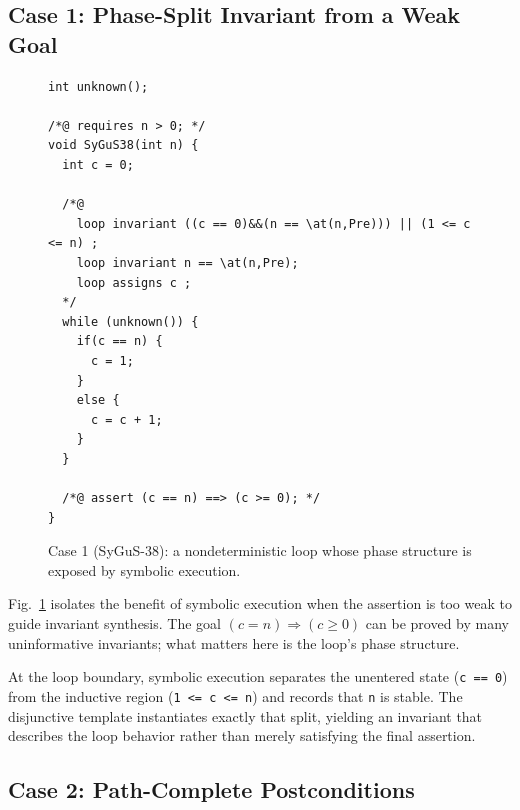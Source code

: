\subsection{Case 1: Phase-Split Invariant from a Weak Goal}

\begin{figure}[!t]
    \centering
    \begin{tcolorbox}[casebox, title={Case 1: symbolic state exposes loop phases}]
\begin{lstlisting}[style=caseinnerstyle]
int unknown();

/*@ requires n > 0; */
void SyGuS38(int n) {
  int c = 0;

  /*@
    loop invariant ((c == 0)&&(n == \at(n,Pre))) || (1 <= c <= n) ;
    loop invariant n == \at(n,Pre);
    loop assigns c ;
  */
  while (unknown()) {
    if(c == n) {
      c = 1;
    }
    else {
      c = c + 1;
    }
  }

  /*@ assert (c == n) ==> (c >= 0); */
}
\end{lstlisting}
    \end{tcolorbox}
    \caption{Case 1 (SyGuS-38): a nondeterministic loop whose phase structure is exposed by symbolic execution.}
    \label{fig:case1}
\end{figure}

Fig.~\ref{fig:case1} isolates the benefit of symbolic execution when the assertion is too weak to guide invariant synthesis. The goal $(c = n) \Rightarrow (c \ge 0)$ can be proved by many uninformative invariants; what matters here is the loop's phase structure.

At the loop boundary, symbolic execution separates the unentered state (\texttt{c == 0}) from the inductive region (\texttt{1 <= c <= n}) and records that \texttt{n} is stable. The disjunctive template instantiates exactly that split, yielding an invariant that describes the loop behavior rather than merely satisfying the final assertion.

\subsection{Case 2: Path-Complete Postconditions }

